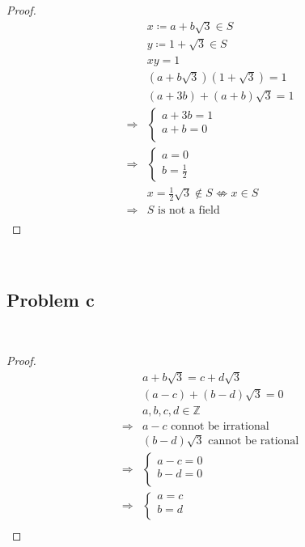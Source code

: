 \documentclass{article}
\begin{document}
\begin{proof}
    \begin{align*}
        &x\coloneqq a+b\sqrt{3}\in S\\
        &y\coloneqq 1+\sqrt{3}\in S\\
        &xy=1\\
        &(a+b\sqrt{3})(1+\sqrt{3})=1\\
        &(a+3b)+(a+b)\sqrt{3}=1\\
        \Rightarrow&\begin{cases}
            a+3b=1\\
            a+b=0\\
        \end{cases}\\
        \Rightarrow&\begin{cases}
            a=0\\
            b=\frac{1}{2}
        \end{cases}\\
        &x=\frac{1}{2}\sqrt{3}\notin S\nLeftrightarrow x\in S\\
        \Rightarrow&S\text{ is not a field}\\
    \end{align*}
\end{proof}

~

\subsection*{Problem c}

~

\begin{proof}
    \begin{align*}
        &a+b\sqrt{3}=c+d\sqrt{3}\\
        &(a-c)+(b-d)\sqrt{3}=0\\
        &a,b,c,d\in\mathbb{Z} \\
        \Rightarrow&a-c\text{ connot be irrational}\\
        &(b-d)\sqrt{3}\text{ cannot be rational}\\
        \Rightarrow&\begin{cases}
            a-c=0\\
            b-d=0\\
        \end{cases}\\
        \Rightarrow&\begin{cases}
            a=c\\
            b=d\\
        \end{cases}\\
    \end{align*}
\end{proof}
\end{document}
